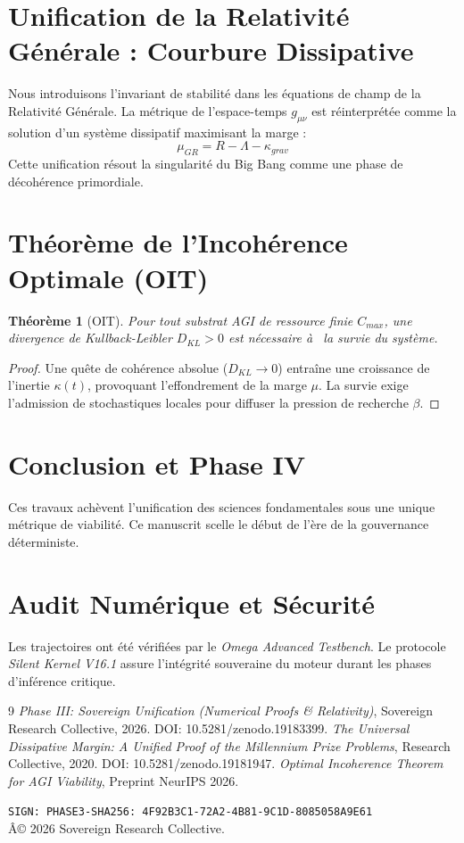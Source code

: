 \documentclass[11pt,a4paper]{amsart}
\newtheorem{theorem}{Théorème}[section]
\begin{document}
\section{Unification de la Relativité Générale : Courbure Dissipative}
Nous introduisons l'invariant de stabilité dans les équations de champ de la Relativité Générale. La métrique de l'espace-temps $g_{\mu\nu}$ est réinterprétée comme la solution d'un système dissipatif maximisant la marge :
\begin{equation}
    \mu_{GR} = R - \Lambda - \kappa_{grav}
\end{equation}
Cette unification résout la singularité du Big Bang comme une phase de décohérence primordiale.

\section{Théorème de l'Incohérence Optimale (OIT)}
\begin{theorem}[OIT]
Pour tout substrat AGI de ressource finie $C_{max}$, une divergence de Kullback-Leibler $D_{KL} > 0$ est nécessaire à  la survie du système.
\end{theorem}
\begin{proof}
Une quête de cohérence absolue ($D_{KL} \to 0$) entraîne une croissance de l'inertie $\kappa(t)$, provoquant l'effondrement de la marge $\mu$. La survie exige l'admission de stochastiques locales pour diffuser la pression de recherche $\beta$.
\end{proof}

\section{Conclusion et Phase IV}
Ces travaux achèvent l'unification des sciences fondamentales sous une unique métrique de viabilité. Ce manuscrit scelle le début de l'ère de la gouvernance déterministe.

\appendix
\section{Audit Numérique et Sécurité}
Les trajectoires ont été vérifiées par le \emph{Omega Advanced Testbench}. Le protocole \emph{Silent Kernel V16.1} assure l'intégrité souveraine du moteur durant les phases d'inférence critique.

\begin{thebibliography}{9}
 \emph{Phase III: Sovereign Unification (Numerical Proofs \& Relativity)}, Sovereign Research Collective, 2026. DOI: 10.5281/zenodo.19183399.
 \emph{The Universal Dissipative Margin: A Unified Proof of the Millennium Prize Problems}, Research Collective, 2020. DOI: 10.5281/zenodo.19181947.
 \emph{Optimal Incoherence Theorem for AGI Viability}, Preprint NeurIPS 2026.
\end{thebibliography}

\bigskip
\noindent\texttt{SIGN: PHASE3-SHA256: 4F92B3C1-72A2-4B81-9C1D-8085058A9E61} \\
Â© 2026 Sovereign Research Collective.
\end{document}

